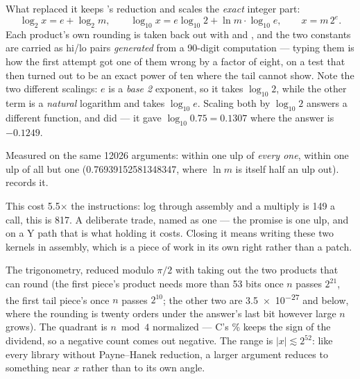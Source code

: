 \begin{description}[style=nextline,leftmargin=5.2em]
    What replaced it keeps 's reduction and scales the \emph{exact}
    integer part:
    \[
      \log_2 x = e + \log_2 m, \qquad
      \log_{10} x = e\log_{10} 2 + \ln m \cdot \log_{10} e,
      \qquad x = m\,2^e.
    \]
    Each product's own rounding is taken back out with  and
    , and the two constants are carried as hi/lo pairs \emph{generated}
    from a \num{90}-digit computation --- typing them is how the first attempt got
    one of them wrong by a factor of eight, on a test that then turned out to be
    an exact power of ten where the tail cannot show. Note the two different
    scalings: $e$ is a \emph{base 2} exponent, so it takes $\log_{10} 2$, while
    the other term is a \emph{natural} logarithm and takes $\log_{10} e$. Scaling
    both by $\log_{10} 2$ answers a different function, and did --- it gave
    $\log_{10} 0.75 = \num{0.1307}$ where the answer is $-\num{0.1249}$.

    Measured on the same \num{12026} arguments:  within one ulp of
    \emph{every one},  within one ulp of all but one
    (\num{0.76939152581348347}, where $\ln m$ is itself half an ulp out).
     records it.

    This cost \num{5.5}$\times$ the instructions: log through assembly and a
    multiply is \num{149} a call, this is \num{817}. A deliberate trade, named as
    one --- the promise is one ulp, and on a Y path that is what holding it
    costs. Closing it means writing these two kernels in assembly, which is a
    piece of work in its own right rather than a patch.
  \item[\ic{math.sin(x)}, \ic{math.cos(x)}, \ic{math.tan(x)}] The trigonometry,
    reduced modulo $\pi/2$ with  taking out the two products that can
    round (the first piece's product needs more than 53 bits once $n$ passes
    $2^{21}$, the first tail piece's once $n$ passes $2^{10}$; the other two
    are \num{3.5e-27} and below, where the rounding is twenty orders under the
    answer's last bit however large $n$ grows). The quadrant is $n \bmod 4$
    normalized --- C's \% keeps the sign of the dividend, so a negative count
    comes out negative. The range is $|x| \lesssim 2^{52}$: like every library
    without Payne--Hanek reduction, a larger argument reduces to something near
    $x$ rather than to its own angle.


\end{description}
